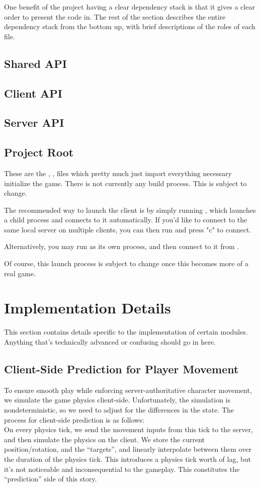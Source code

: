 \documentclass{article}
\begin{document}
One benefit of the project having a clear dependency stack is that it gives a clear order to present the code in.
The rest of the section describes the entire dependency stack from the bottom up, with brief descriptions of the roles
of each file.
\subsection{Shared API}
\subsection{Client API}
\subsection{Server API}
\subsection{Project Root}
These are the , , 
files which pretty much just import everything necessary initialize the game. 
There is not currently any build process. This is subject to change.

The recommended way to launch the client is by simply running , which
launches a child  process and connects to it automatically.
If you'd like to connect to the same local server on multiple clients, you can then run
 and press "c" to connect.

Alternatively, you may run  as its own process, and then connect
to it from .

Of course, this launch process is subject to change once this becomes more of a real game.

\section{Implementation Details}
This section contains details specific to the implementation of certain modules. Anything that's technically
advanced or confusing should go in here.
\subsection{Client-Side Prediction for Player Movement}
To ensure smooth play while enforcing server-authoritative character movement,
we simulate the game physics client-side. Unfortunately, the simulation
is nondeterministic, so we need to adjust for the differences in the state.
The process for client-side prediction is as follows:\\
On every physics tick, we send the movement inputs from this tick to
the server, and then simulate the physics on the client. We store the
current position/rotation, and the ``targets'', and linearly interpolate
between them over the duration of the physics tick. This introduces a
physics tick worth of lag, but it's not noticeable and inconsequential
to the gameplay. This constitutes the ``prediction'' side of this story.
\end{document}
